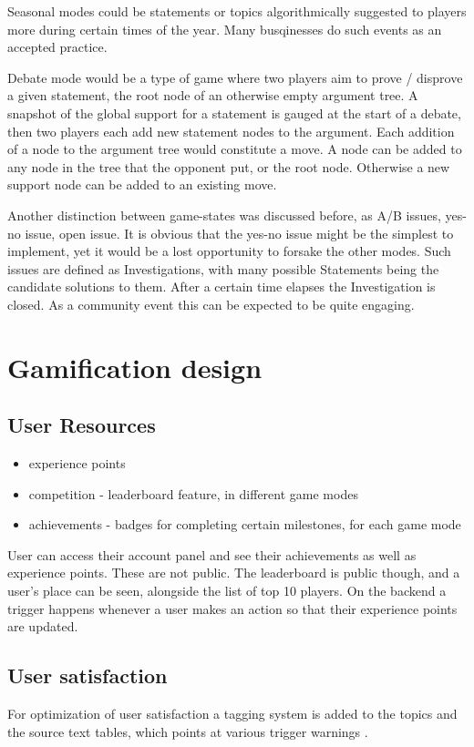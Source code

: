 \documentclass{report}
\begin{document}
Seasonal modes could be statements or topics algorithmically suggested to players more during certain times of the year. Many busqinesses do such events as an accepted practice.

Debate mode would be a type of game where two players aim to prove / disprove a given statement, the root node of an otherwise empty argument tree.  A snapshot of the global support for a statement is gauged at the start of a debate, then two players each add new statement nodes to the argument. Each addition of a node to the argument tree would constitute a move.
A node can be added to any node in the tree that the opponent put, or the root node. Otherwise a new support node can be added to an existing move.

Another distinction between game-states was discussed before, as A/B issues, yes-no issue, open issue. It is obvious that the yes-no issue might be the simplest to implement, yet it would be a lost opportunity to forsake the other modes.
Such issues are defined as Investigations, with many possible Statements being the candidate solutions to them. After a certain time elapses the Investigation is closed. As a community event this can be expected to be quite engaging.

\section{Gamification design}
\subsection{User Resources}
\begin{itemize}
  \item experience points 
  \item competition - leaderboard feature, in different game modes
  \item achievements - badges for completing certain milestones, for each game mode
\end{itemize}

User can access their account panel and see their achievements as well as experience points. These are not public. The leaderboard is public though, and a user's place can be seen, alongside the list of top 10 players. On the backend a trigger happens whenever a user makes an action so that their experience points are updated.
\subsection{User satisfaction}
For optimization of user satisfaction a tagging system is added to the topics and the source text tables, which points at various trigger warnings \cite{annemieke_small_2019}.
\newpage
\end{document}
